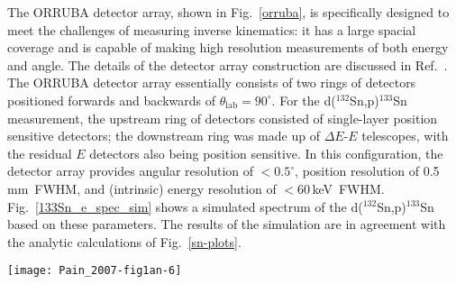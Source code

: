 The ORRUBA detector array, shown in Fig.~\ref{orruba}, is specifically designed to meet the challenges of measuring inverse kinematics: it has a large spacial coverage and is capable of making high resolution measurements of both energy and angle.  The details of the detector array construction are discussed in Ref.~\cite{Pain_2007}.  The ORRUBA detector array essentially consists of two rings of detectors positioned forwards and  backwards of $\theta_\mathrm{lab}=90^\circ$.  For the d($^{132}$Sn,p)$^{133}$Sn measurement, the upstream ring of detectors consisted of single-layer position sensitive detectors; the downstream ring was made up of $\Delta E$-$E$ telescopes, with the residual $E$ detectors also being position sensitive.  In this configuration, the detector array provides angular resolution of $<0.5^\circ$, position resolution of 0.5\,mm~FWHM, and (intrinsic) energy resolution of $<60$\,keV~FWHM.  Fig.~\ref{133Sn_e_spec_sim} shows a simulated spectrum of the d($^{132}$Sn,p)$^{133}$Sn based on these parameters.  The results of the simulation are in agreement with the analytic calculations of Fig.~\ref{sn-plots}.

\begin{figure*}
\begin{center}
\centering
\texttt{[image: Pain\_2007-fig1an-6]}
\end{center}
\caption[Simulated $E_\mathrm{lab}$ vs. $\theta_\mathrm{lab}$ spectrum for the $d$($^{132}$Sn,$p$)$^{133}$Sn  reaction at 4.78\,\AMeV with ORRUBA]{(color online) Simulated $E_\mathrm{lab}$ vs. $\theta_\mathrm{lab}$ spectrum for the $d$($^{132}$Sn,$p$)$^{133}$Sn reaction at 4.78\,\AMeV with ORRUBA. The simulation includes elastic scattering of protons, deuterons, and $^{12}$C.  Analytical calculations have been plotted over the simulated results using the axes of the original figure.  The calculations are color-coded to match Fig.~\ref{133Sn_e}.  At $\theta_\mathrm{lab}=120^\circ$ 
  ($\theta_\mathrm{cm}=22.9^\circ$) the kinematic compression coefficient  is $\Delta E_\mathrm{lab}/\Delta E_\mathrm{cm}=0.34$.  Annotated    figure taken from Ref.~\cite{Pain_2007}.}
\label{133Sn_e_spec_sim}%
\end{figure*}

